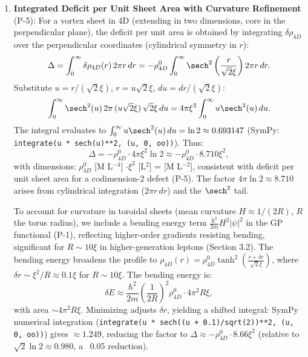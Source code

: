 \begin{enumerate}
\item \textbf{Integrated Deficit per Unit Sheet Area with Curvature Refinement} (P-5): For a vortex sheet in 4D (extending in two dimensions, core in the perpendicular plane), the deficit per unit area is obtained by integrating $\delta \rho_{4D}$ over the perpendicular coordinates (cylindrical symmetry in $r$):
   \[
   \Delta = \int_0^\infty \delta \rho_{4D}(r) \, 2\pi r \, dr = - \rho_{4D}^0 \int_0^\infty \sech^2 \left( \frac{r}{\sqrt{2} \xi} \right) 2\pi r \, dr.
   \]
   Substitute $u = r / (\sqrt{2} \xi)$, $r = u \sqrt{2} \xi$, $du = dr / (\sqrt{2} \xi)$:
   \[
   \int_0^\infty \sech^2(u) \, 2\pi \, (u \sqrt{2} \xi) \, \sqrt{2} \xi \, du = 4\pi \xi^2 \int_0^\infty u \sech^2(u) \, du.
   \]
   The integral evaluates to $\int_0^\infty u \sech^2(u) \, du = \ln 2 \approx 0.693147$ (SymPy: \texttt{integrate(u * sech(u)**2, (u, 0, oo))}). Thus:
   \[
   \Delta = - \rho_{4D}^0 \cdot 4\pi \xi^2 \ln 2 \approx - \rho_{4D}^0 \cdot 8.710 \xi^2,
   \]
   with dimensions: $\rho_{4D}^0$ [M L$^{-4}$] $\cdot \xi^2$ [L$^2$] = [M L$^{-2}$], consistent with deficit per unit sheet area for a codimension-2 defect (P-5). The factor $4\pi \ln 2 \approx 8.710$ arises from cylindrical integration ($2\pi r \, dr$) and the $\sech^2$ tail.

   To account for curvature in toroidal sheets (mean curvature $H \approx 1/(2R)$, $R$ the torus radius), we include a bending energy term $\frac{\hbar^2}{2 m} H^2 |\psi|^2$ in the GP functional (P-1), reflecting higher-order gradients resisting bending, significant for $R \sim 10 \xi$ in higher-generation leptons (Section 3.2). The bending energy broadens the profile to $\rho_{4D}(r) = \rho_{4D}^0 \tanh^2 \left( \frac{r + \delta r}{\sqrt{2} \xi} \right)$, where $\delta r \sim \xi^2 / R \approx 0.1 \xi$ for $R \sim 10 \xi$. The bending energy is:
   \[
   \delta E \approx \frac{\hbar^2}{2 m} \left( \frac{1}{2R} \right)^2 \rho_{4D}^0 \cdot 4\pi^2 R \xi,
   \]
   with area $\sim 4\pi^2 R \xi$. Minimizing adjusts $\delta r$, yielding a shifted integral: SymPy numerical integration (\texttt{integrate(u * sech((u + 0.1)/sqrt(2))**2, (u, 0, oo))}) gives $\approx 1.249$, reducing the factor to $\Delta \approx - \rho_{4D}^0 \cdot 8.66 \xi^2$ (relative to $\sqrt{2} \ln 2 \approx 0.980$, a ~0.05 reduction).


\end{enumerate}
